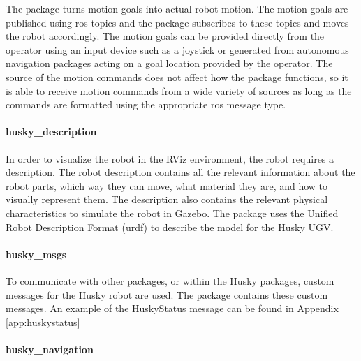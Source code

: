 The package  turns motion goals into actual robot motion. The motion goals are published using \acrshort{ros} topics and the  package subscribes to these topics and moves the robot accordingly. The motion goals can be provided directly from the operator using an input device such as a joystick or generated from autonomous navigation packages acting on a goal location provided by the operator. The source of the motion commands does not affect how the package functions, so it is able to receive motion commands from a wide variety of sources as long as the commands are formatted using the appropriate \acrshort{ros} message type.\\ 

\paragraph{husky\_description}

In order to visualize the robot in the RViz environment, the robot requires a description. The robot description contains all the relevant information about the robot parts, which way they can move, what material they are, and how to visually represent them. The description also contains the relevant physical characteristics to simulate the robot in Gazebo. The  package uses the Unified Robot Description Format (\acrshort{urdf}) to describe the model for the Husky UGV.\\

\paragraph{husky\_msgs}

To communicate with other packages, or within the Husky packages, custom messages for the Husky robot are used. The  package contains these custom messages. An example of the HuskyStatus message can be found in Appendix \ref{app:huskystatus}


\paragraph{husky\_navigation}

